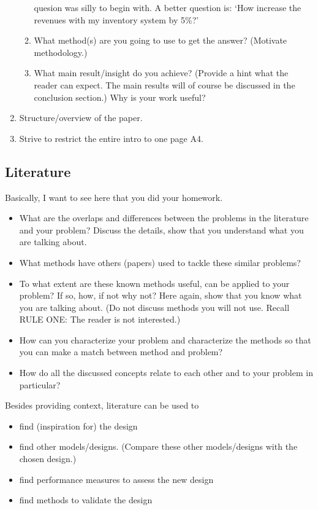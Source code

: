 \documentclass{article}
\begin{document}
\begin{enumerate}
\begin{enumerate}
    quesion was silly to begin with. A better question is: `How
    increase the revenues with my inventory system by 5\%?'
  \item What method(s) are you going to use to get the answer? (Motivate methodology.)
  \item What main result/insight do you achieve? (Provide a hint what
    the reader can expect. The main results will of course be
    discussed in the conclusion section.) Why is your work useful?
  \end{enumerate}
\item Structure/overview of the paper.
\item Strive to restrict the entire intro to one page A4.
\end{enumerate}



\subsection{Literature}
\label{sec:literature}

Basically, I want to see here that you did your homework. 

\begin{itemize}
\item What are the overlaps and differences between the problems in
  the literature and your problem? Discuss the details, show that you
  understand what you are talking about. 
\item What methods have others (papers) used to tackle these similar
  problems? 
\item To what extent are these known methods useful, can be applied to
  your problem? If so, how, if not why not? Here again, show that you
  know what you are talking about. (Do not discuss methods you will
  not use. Recall RULE ONE: The reader is not interested.)
\item How can you characterize your problem and characterize the
  methods so that you can make a match between method and problem?
\item How do all the discussed concepts relate to each other and to your problem in particular?
\end{itemize}

Besides providing context, literature can  be used to
\begin{itemize}
\item find (inspiration for) the design
\item find other models/designs. (Compare these other models/designs with the chosen design.)
\item find performance measures to assess the new design
\item find methods to validate the design
\end{itemize}
\end{document}
